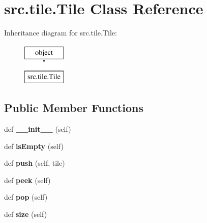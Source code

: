 \hypertarget{classsrc_1_1tile_1_1_tile}{}\section{src.\+tile.\+Tile Class Reference}
\label{classsrc_1_1tile_1_1_tile}
Inheritance diagram for src.\+tile.\+Tile\+:\begin{figure}[H]
\begin{center}
\leavevmode
\includegraphics[height=2.000000cm]{classsrc_1_1tile_1_1_tile}
\end{center}
\end{figure}
\subsection*{Public Member Functions}
\begin{DoxyCompactItemize}
\item 
\hypertarget{classsrc_1_1tile_1_1_tile_a9976e652dac509c6aee814af20a6cabb}{}def {\bfseries \+\_\+\+\_\+init\+\_\+\+\_\+} (self)\label{classsrc_1_1tile_1_1_tile_a9976e652dac509c6aee814af20a6cabb}

\item 
\hypertarget{classsrc_1_1tile_1_1_tile_aad77febc9fbb4fa5fd2f13449d1c80da}{}def {\bfseries is\+Empty} (self)\label{classsrc_1_1tile_1_1_tile_aad77febc9fbb4fa5fd2f13449d1c80da}

\item 
\hypertarget{classsrc_1_1tile_1_1_tile_ab682d4a8d92f6dbe5380c21e8c27114a}{}def {\bfseries push} (self, tile)\label{classsrc_1_1tile_1_1_tile_ab682d4a8d92f6dbe5380c21e8c27114a}

\item 
\hypertarget{classsrc_1_1tile_1_1_tile_a0a8402816b245a69773305cc6d86f16d}{}def {\bfseries peek} (self)\label{classsrc_1_1tile_1_1_tile_a0a8402816b245a69773305cc6d86f16d}

\item 
\hypertarget{classsrc_1_1tile_1_1_tile_ae0f31d367515d3259f21b90d6be44db8}{}def {\bfseries pop} (self)\label{classsrc_1_1tile_1_1_tile_ae0f31d367515d3259f21b90d6be44db8}

\item 
\hypertarget{classsrc_1_1tile_1_1_tile_ac9f0ddf090f58449aa74611a239e1458}{}def {\bfseries size} (self)\label{classsrc_1_1tile_1_1_tile_ac9f0ddf090f58449aa74611a239e1458}

\end{DoxyCompactItemize}
